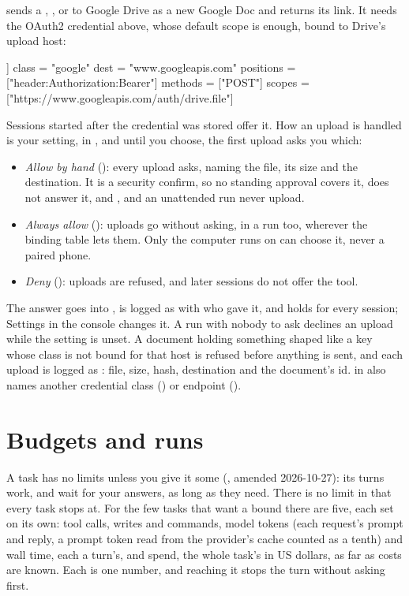  sends a , ,  or
 to Google Drive as a new Google Doc and returns its link. It
needs the OAuth2 credential above, whose default scope 
is enough, bound to Drive's upload host:

\begin{txt}
[[bind]]
class = "google"
dest = "www.googleapis.com"
positions = ["header:Authorization:Bearer"]
methods = ["POST"]
scopes = ["https://www.googleapis.com/auth/drive.file"]
\end{txt}

Sessions started after the credential was stored offer it. How an upload
is handled is your setting,  in \code{[docs]}, and
until you choose, the first upload asks you which:

\begin{itemize}
\item \emph{Allow by hand} (): every upload asks, naming the
  file, its size and the destination. It is a security confirm, so no
  standing approval covers it,  does not answer it,
  and ,  and an unattended run never upload.
\item \emph{Always allow} (): uploads go without asking,
  in a run too, wherever the binding table lets them. Only the computer
  \nodwyn{} runs on can choose it, never a paired phone.
\item \emph{Deny} (): uploads are refused, and later sessions
  do not offer the tool.
\end{itemize}

The answer goes into , is logged as
 with who gave it, and holds for every session;
Settings in the console changes it. A run with nobody to ask declines an
upload while the setting is unset. A
document holding something shaped like a key whose class is not bound for
that host is refused before anything is sent, and each upload is logged as
: file, size, hash, destination and the document's id.
\code{[docs]} in  also names another credential class
() or endpoint ().

\chapter{Budgets and runs}

A task has no limits unless you give it some (, amended
2026-10-27): its turns work, and wait for your answers, as long as they
need. There is no limit in  that every task stops at.
For the few tasks that want a bound there are five, each set on its own:
tool calls, writes and commands, model tokens (each request's prompt and
reply, a prompt token read from the provider's cache counted as a tenth)
and wall time, each a turn's, and spend, the whole task's in US dollars, as
far as costs are known. Each is one number, and reaching it stops the turn
without asking first.

